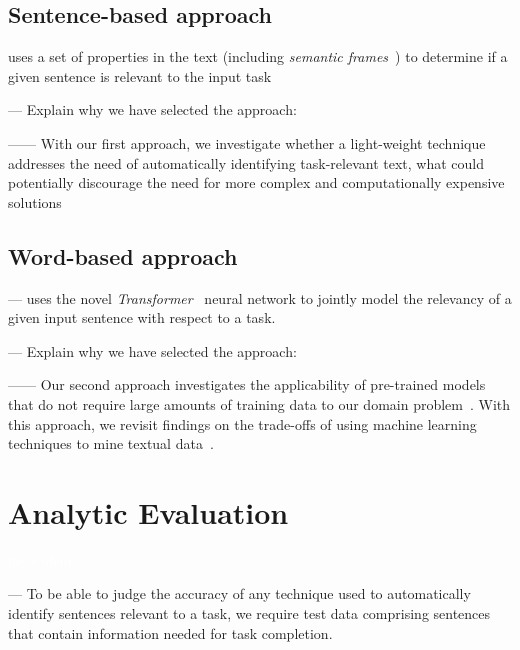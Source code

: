 \subsection{Sentence-based approach}

uses a set of properties in the text (including \textit{semantic frames}~\cite{fillmore1976frame}) to determine if a given sentence is relevant to the input task



--- Explain why we have selected the approach:

------ With our first approach, we investigate whether a light-weight technique addresses the need of automatically identifying task-relevant text, what could potentially discourage the need for more complex and computationally expensive solutions~\cite{Bavota2016}


\subsection{Word-based approach}

--- uses the novel \textit{Transformer}~\cite{Vaswani2017attention} neural network to jointly model the relevancy of a given input sentence with respect to a task. 

--- Explain why we have selected the approach:

------ Our second approach investigates the applicability of pre-trained models that do not require large amounts of training data to our domain problem~\cite{devlin2018bert, Ye2016}. With this approach, we revisit findings on the trade-offs of using machine learning techniques to mine textual data~\cite{Chaparro2017, Bavota2016}.



\clearpage



\section{Analytic Evaluation}
\textcolor{white}{force ident} %


--- To be able to judge the accuracy of any technique used to automatically identify sentences relevant to a task,
we require test data comprising sentences that contain information needed for task completion. \vspace{3mm}

